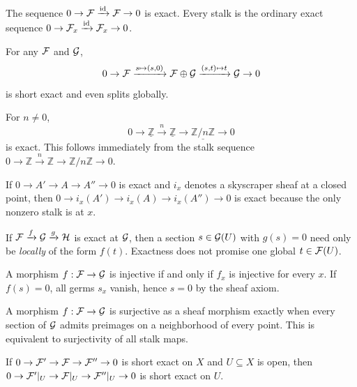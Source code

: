 \begin{example}
The sequence $0\to\mathcal F\xrightarrow{\operatorname{id}}\mathcal F\to0$ is exact.  Every stalk is the ordinary exact sequence $0\to\mathcal F_x\xrightarrow{\operatorname{id}}\mathcal F_x\to0$.
\end{example}

\begin{example}
For any $\mathcal F$ and $\mathcal G$,
\[
0\to\mathcal F\xrightarrow{s\mapsto(s,0)}\mathcal F\oplus\mathcal G\xrightarrow{(s,t)\mapsto t}\mathcal G\to0
\]
is short exact and even splits globally.
\end{example}

\begin{example}
For $n\neq0$,
\[
0\to\underline{\mathbb Z}\xrightarrow{n}\underline{\mathbb Z}\to
\underline{\mathbb Z/n\mathbb Z}\to0
\]
is exact.  This follows immediately from the stalk sequence $0\to\mathbb Z\xrightarrow{n}\mathbb Z\to\mathbb Z/n\mathbb Z\to0$.
\end{example}

\begin{example}
If $0\to A'\to A\to A''\to0$ is exact and $i_x$ denotes a skyscraper sheaf at a closed point, then
$0\to i_x(A')\to i_x(A)\to i_x(A'')\to0$ is exact because the only nonzero stalk is at $x$.
\end{example}

\begin{example}
If $\mathcal F\xrightarrow{f}\mathcal G\xrightarrow{g}\mathcal H$ is exact at $\mathcal G$, then a section $s\in\mathcal G(U)$ with $g(s)=0$ need only be \emph{locally} of the form $f(t)$.  Exactness does not promise one global $t\in\mathcal F(U)$.
\end{example}

\begin{example}
A morphism $f:\mathcal F\to\mathcal G$ is injective if and only if $f_x$ is injective for every $x$.  If $f(s)=0$, all germs $s_x$ vanish, hence $s=0$ by the sheaf axiom.
\end{example}

\begin{example}
A morphism $f:\mathcal F\to\mathcal G$ is surjective as a sheaf morphism exactly when every section of $\mathcal G$ admits preimages on a neighborhood of every point.  This is equivalent to surjectivity of all stalk maps.
\end{example}

\begin{example}
If $0\to\mathcal F'\to\mathcal F\to\mathcal F''\to0$ is short exact on $X$ and $U\subseteq X$ is open, then
$0\to\mathcal F'|_U\to\mathcal F|_U\to\mathcal F''|_U\to0$ is short exact on $U$.
\end{example}

